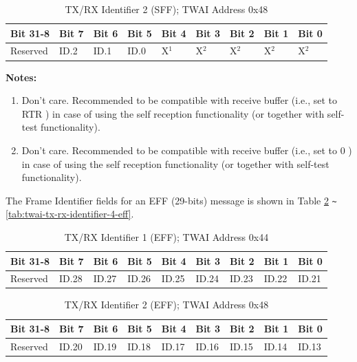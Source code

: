 \documentclass[main\_\_EN.tex]{subfiles}
\begin{document}
\begin{longtable}[c]{|p{1.4cm}|p{1.4cm}|p{1.4cm}|p{1.4cm}|p{1.4cm}|p{1.4cm}|p{1.4cm}|p{1.4cm}|p{1.4cm}|}
    \caption{TX/RX Identifier 2 (SFF); TWAI Address 0x48}
    \label{tab:twai-tx-rx-identifier-2-sff}\\
    \hline
       \rowcolor{lightgray}
    \textbf{Bit 31-8} & \textbf{Bit 7} & \textbf{Bit 6} & \textbf{Bit 5} & \textbf{Bit 4} & \textbf{Bit 3} & \textbf{Bit 2} & \textbf{Bit 1} & \textbf{Bit 0}\\\hline
    Reserved & ID.2 & ID.1 & ID.0 & X$^1$ & X$^2$ & X$^2$ & X$^2$ & X$^2$\\
    \hline
\end{longtable}
\vspace{-1.5em}
{\bfseries Notes:}\\
\begin{enumerate}
    \item Don't care. Recommended to be compatible with receive buffer (i.e., set to RTR ) in case of using the self reception functionality (or together with self-test functionality).
    \item Don't care. Recommended to be compatible with receive buffer (i.e., set to 0 ) in case of using the self reception functionality (or together with self-test functionality). 
\end{enumerate}


The Frame Identifier fields for an EFF (29-bits) message is shown in Table \ref{tab:twai-tx-rx-identifier-1-eff} \verb+~+ \ref{tab:twai-tx-rx-identifier-4-eff}.

\clearpage

\begin{longtable}[c]{|p{1.4cm}|p{1.4cm}|p{1.4cm}|p{1.4cm}|p{1.4cm}|p{1.4cm}|p{1.4cm}|p{1.4cm}|p{1.4cm}|}
    \caption{TX/RX Identifier 1 (EFF); TWAI Address 0x44}
    \label{tab:twai-tx-rx-identifier-1-eff}\\
    \hline
       \rowcolor{lightgray}
    \textbf{Bit 31-8} & \textbf{Bit 7} & \textbf{Bit 6} & \textbf{Bit 5} & \textbf{Bit 4} & \textbf{Bit 3} & \textbf{Bit 2} & \textbf{Bit 1} & \textbf{Bit 0}\\\hline
    Reserved & ID.28 & ID.27 & ID.26 & ID.25 & ID.24 & ID.23 & ID.22 & ID.21\\
    \hline
\end{longtable}

\begin{longtable}[c]{|p{1.4cm}|p{1.4cm}|p{1.4cm}|p{1.4cm}|p{1.4cm}|p{1.4cm}|p{1.4cm}|p{1.4cm}|p{1.4cm}|}
    \caption{TX/RX Identifier 2 (EFF); TWAI Address 0x48}
    \label{tab:twai-tx-rx-identifier-2-eff}\\
    \hline
       \rowcolor{lightgray}
    \textbf{Bit 31-8} & \textbf{Bit 7} & \textbf{Bit 6} & \textbf{Bit 5} & \textbf{Bit 4} & \textbf{Bit 3} & \textbf{Bit 2} & \textbf{Bit 1} & \textbf{Bit 0}\\\hline
    Reserved & ID.20 & ID.19 & ID.18 & ID.17 & ID.16 & ID.15 & ID.14 & ID.13\\
    \hline
\end{longtable}
\end{document}
